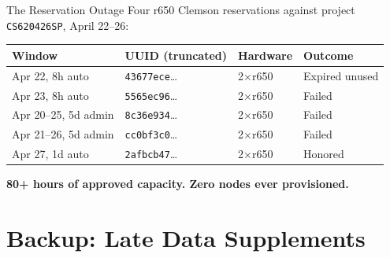 \begin{frame}{The Reservation Outage}
\small
Four r650 Clemson reservations against project \texttt{CS620426SP}, April 22--26:
\vspace{0.3em}
\begin{center}
\begin{tabular}{@{}llll@{}}
\toprule
Window & UUID (truncated) & Hardware & Outcome \\
\midrule
Apr 22, 8h auto              & \texttt{43677ece}\ldots & 2$\times$r650 & Expired unused \\
Apr 23, 8h auto              & \texttt{5565ec96}\ldots & 2$\times$r650 & {\color{mRed}Failed} \\
Apr 20--25, 5d admin         & \texttt{8c36e934}\ldots & 2$\times$r650 & {\color{mRed}Failed} \\
Apr 21--26, 5d admin         & \texttt{cc0bf3c0}\ldots & 2$\times$r650 & {\color{mRed}Failed} \\
Apr 27, 1d auto              & \texttt{2afbcb47}\ldots & 2$\times$r650 & {\color{mGreen}Honored} \\
\bottomrule
\end{tabular}
\end{center}
\vspace{0.5em}
\textbf{80+ hours of approved capacity. Zero nodes ever provisioned.}
\end{frame}

\section{Backup: Late Data Supplements}

